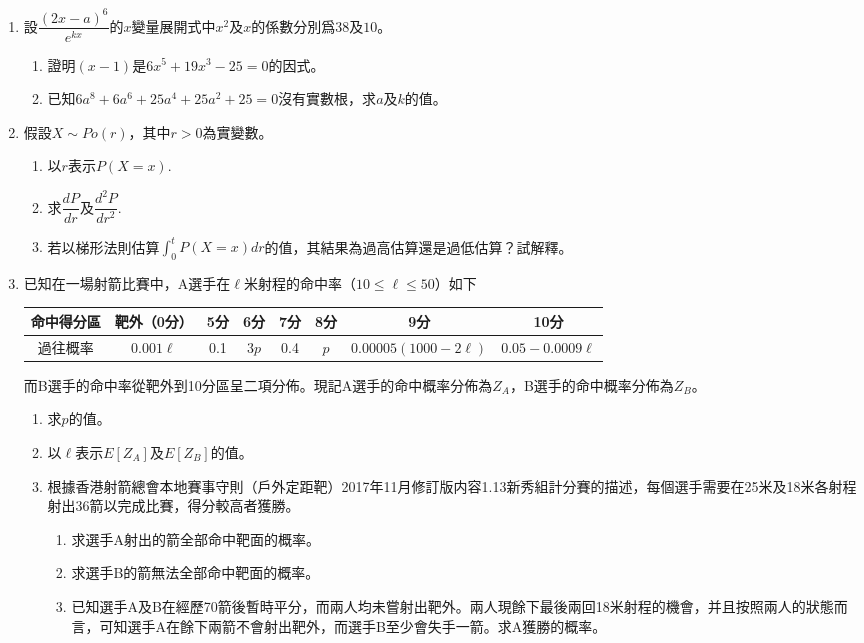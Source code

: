 \documentclass[12pt]{article}
\begin{document}
    \begin{enumerate}
        \item 設$\dfrac{(2x-a)^6}{e^{kx}}$的$x$變量展開式中$x^2$及$x$的係數分別爲$38$及$10$。
        \begin{enumerate}
            \item 證明$(x-1)$是$6x^5+19x^3-25=0$的因式。
            \item 已知$6a^8+6a^6+25a^4+25a^2+25=0$沒有實數根，求$a$及$k$的值。
        \end{enumerate}
        \item 假設$X\sim Po(r)$，其中$r>0$為實變數。\begin{enumerate}
            \item 以$r$表示$P(X=x)$.
            \item 求$\dfrac{dP}{dr}$及$\dfrac{d^2P}{dr^2}$.
            \item 若以梯形法則估算$\int_{0}^{t}P(X=x) dr$的值，其結果為過高估算還是過低估算？試解釋。
        \end{enumerate}
        \item 已知在一場射箭比賽中，A選手在$\ell$米射程的命中率（$10\leq \ell \leq 50$）如下\begin{center}
            \begin{tabular}{|c||c|c|c|c|c|c|c|}
                \hline
                命中得分區&靶外（0分）&5分&6分&7分&8分&9分&10分\\
                \hline
                過往概率&$0.001\ell$&0.1&$3p$&0.4&$p$&$0.00005(1000-2\ell)$&$0.05-0.0009\ell$\\
                \hline
            \end{tabular}
        \end{center}
        而B選手的命中率從靶外到10分區呈二項分佈。現記A選手的命中概率分佈為$Z_A$，B選手的命中概率分佈為$Z_B$。\begin{enumerate}
            \item 求$p$的值。
            \item 以$\ell$表示$E[Z_A]$及$E[Z_B]$的值。
            \item 根據香港射箭總會本地賽事守則（戶外定距靶）2017年11月修訂版内容1.13新秀組計分賽的描述，每個選手需要在25米及18米各射程射出36箭以完成比賽，得分較高者獲勝。\begin{enumerate}
                \item 求選手A射出的箭全部命中靶面的概率。
                \item 求選手B的箭無法全部命中靶面的概率。
                \item 已知選手A及B在經歷70箭後暫時平分，而兩人均未嘗射出靶外。兩人現餘下最後兩回18米射程的機會，并且按照兩人的狀態而言，可知選手A在餘下兩箭不會射出靶外，而選手B至少會失手一箭。求A獲勝的概率。

\end{enumerate}
\end{enumerate}
\end{enumerate}
\end{document}
